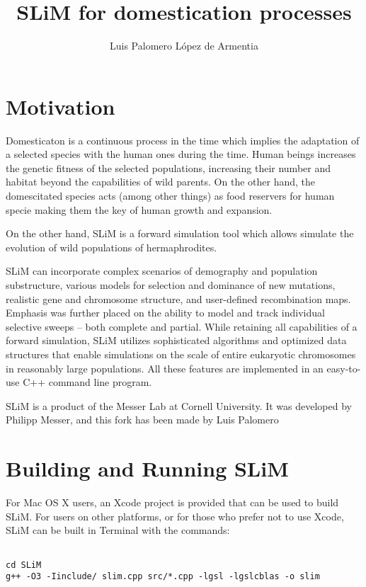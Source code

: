 \documentclass{article}
\title{SLiM for domestication processes}
\author{Luis Palomero López de Armentia}
\begin{document}
\maketitle

\section{Motivation}

Domesticaton is a continuous process in the time which implies the adaptation of a selected species with the human ones during the time. Human beings increases the genetic fitness of the selected populations, increasing their number and habitat beyond the capabilities of wild parents. On the other hand, the domescitated species acts (among other things) as food reservers for human specie making them the key of human growth and expansion.


On the other hand, SLiM is a forward simulation tool which allows simulate the evolution of wild populations of hermaphrodites. 

SLiM can incorporate complex scenarios of demography and population substructure, various models for selection and dominance of new mutations, realistic gene and chromosome structure, and user-defined recombination maps. Emphasis was further placed on the ability to model and track individual selective sweeps – both complete and partial. While retaining all capabilities of a forward simulation, SLiM utilizes sophisticated algorithms and optimized data structures that enable simulations on the scale of entire eukaryotic chromosomes in reasonably large populations. All these features are implemented in an easy-to-use C++ command line program.

SLiM is a product of the Messer Lab at Cornell University. It was developed by Philipp Messer, and this fork has been made by Luis Palomero

\section{Building and Running SLiM}

For Mac OS X users, an Xcode project is provided that can be used to build SLiM. For users on other platforms, or for those who prefer not to use Xcode, SLiM can be built in Terminal with the commands:

\begin{verbatim}

cd SLiM
g++ -O3 -Iinclude/ slim.cpp src/*.cpp -lgsl -lgslcblas -o slim

\end{verbatim}
\end{document}
